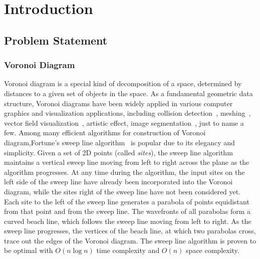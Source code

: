 \chapter{Introduction}
\label{introduction}

\section{Problem Statement}
\subsection{Voronoi Diagram}
Voronoi diagram is a special kind of decomposition of a space, determined by distances to a given set of objects in the space. As a fundamental geometric data structure, Voronoi diagrams have been widely applied in various computer graphics and visualization applications, including collision detection~\cite{Sud:2006:FPC:1141911.1142006},
meshing~\cite{DBLP:journals/cgf/YanLLSW09}, vector field visualization~\cite{DBLP:conf/vissym/McKenzieLD05}, artistic effect, image %
segmentation~\cite{DBLP:journals/tip/WangJW11}, just to name a few. Among many efficient algorithms for construction of Voronoi diagram,Fortune's sweep line algorithm~\cite{Fortune1986} is popular due to its elegancy and simplicity. Given a set of 2D points (called \textit{sites}), the sweep line algorithm maintains a vertical sweep line moving from left to right across the plane as the algorithm progresses. At any time during the algorithm, the input sites on the
left side of the sweep line have already been incorporated into the Voronoi diagram, while the sites right of the sweep line have not been considered yet. Each site to the left of the sweep line generates a parabola of points equidistant from that point and from the sweep line. The wavefronts of all parabolas form a curved beach line, which follows the sweep line moving from left to right. As the sweep line progresses, the vertices of the beach line, at which two parabolas cross, trace out the edges of the Voronoi diagram. The sweep line algorithm is proven to be optimal with $O(n\log n)$ time complexity and $O(n)$ space complexity.

